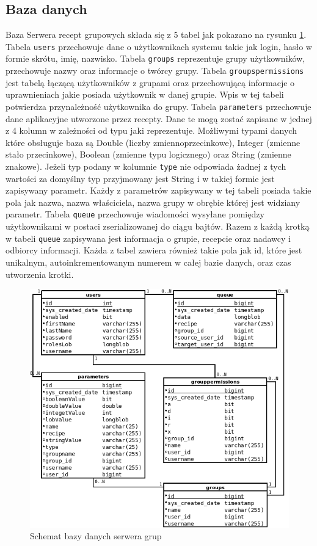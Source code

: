 \documentclass[11pt,a4paper,polish,thesis]{dcsbook}
\begin{document}
\subsection{Baza danych}
Baza Serwera recept grupowych składa się z 5 tabel jak pokazano na rysunku \ref{fig:server_db}. 
Tabela \texttt{users} przechowuje  dane o użytkownikach systemu takie jak login, hasło w formie skrótu, imię, nazwisko.
Tabela \texttt{groups} reprezentuje grupy użytkowników, przechowuje nazwy oraz informacje o twórcy grupy.
Tabela \texttt{groupspermissions} jest tabelą łączącą użytkowników z grupami oraz przechowującą informacje o uprawnieniach jakie posiada użytkownik w danej grupie. 
Wpis w tej tabeli potwierdza przynależność użytkownika do grupy.
Tabela \texttt{parameters} przechowuje dane aplikacyjne utworzone przez recepty. 
Dane te mogą zostać zapisane w jednej z 4 kolumn w zależności od typu jaki reprezentuje. 
Możliwymi typami danych które obsługuje baza są Double (liczby zmiennoprzecinkowe), Integer (zmienne stało przecinkowe), Boolean (zmienne typu logicznego) oraz String (zmienne znakowe). 
Jeżeli typ podany w kolumnie \texttt{type} nie odpowiada żadnej z tych wartości za domyślny typ przyjmowany jest String i w takiej formie jest zapisywany parametr.
Każdy z parametrów zapisywany w tej tabeli posiada takie pola jak nazwa, nazwa właściciela, nazwa grupy w obrębie której jest widziany parametr.
Tabela \texttt{queue} przechowuje wiadomości wysyłane pomiędzy użytkownikami w postaci zserializowanej do ciągu bajtów.
Razem z każdą krotką w tabeli \texttt{queue} zapisywana jest informacja o grupie, recepcie oraz nadawcy i odbiorcy informacji.
Każda z tabel zawiera również takie pola jak id, które jest unikalnym, autoinkrementowanym numerem w całej bazie danych, oraz czas utworzenia krotki.
\begin{figure}[H]
  \centering
  \includegraphics[scale=0.7]{./resources/server_db.png}
  \caption{Schemat bazy danych serwera grup}
  \label{fig:server_db}
\end{figure}
\end{document}
